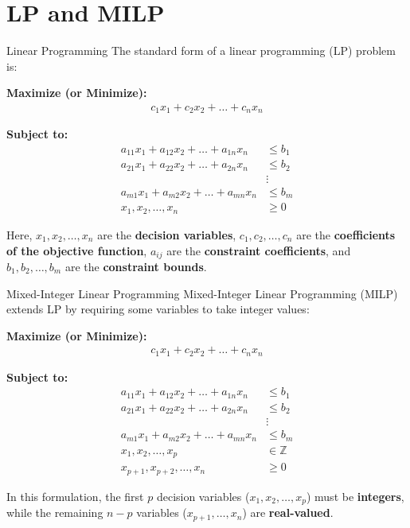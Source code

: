 \documentclass{beamer}
\begin{document}
\section{LP and MILP}
\begin{frame}{Linear Programming}
The standard form of a linear programming (LP) problem is:

\vspace{0.5em}
\textbf{Maximize (or Minimize):}
\begin{align*}
    c_1x_1 + c_2x_2 + \dots + c_nx_n
\end{align*}

\vspace{0.5em}
\textbf{Subject to:}
\begin{align*}
    a_{11}x_1 + a_{12}x_2 + \dots + a_{1n}x_n &\leq b_1 \\
    a_{21}x_1 + a_{22}x_2 + \dots + a_{2n}x_n &\leq b_2 \\
    &\vdots \\
    a_{m1}x_1 + a_{m2}x_2 + \dots + a_{mn}x_n &\leq b_m \\
    x_1, x_2, \dots, x_n &\geq 0
\end{align*}

\vspace{0.5em}
\small
Here, $x_1, x_2, \dots, x_n$ are the \textbf{decision variables}, $c_1, c_2, \dots, c_n$ are the \textbf{coefficients of the objective function}, $a_{ij}$ are the \textbf{constraint coefficients}, and $b_1, b_2, \dots, b_m$ are the \textbf{constraint bounds}.
\end{frame}
\begin{frame}{Mixed-Integer Linear Programming}
Mixed-Integer Linear Programming (MILP) extends LP by requiring some variables to take integer values:

\vspace{0.5em}
\textbf{Maximize (or Minimize):}
\begin{align*}
    c_1x_1 + c_2x_2 + \dots + c_nx_n
\end{align*}

\vspace{0.5em}
\textbf{Subject to:}
\begin{align*}
    a_{11}x_1 + a_{12}x_2 + \dots + a_{1n}x_n &\leq b_1 \\
    a_{21}x_1 + a_{22}x_2 + \dots + a_{2n}x_n &\leq b_2 \\
    &\vdots \\
    a_{m1}x_1 + a_{m2}x_2 + \dots + a_{mn}x_n &\leq b_m \\
    x_1, x_2, \dots, x_p &\in \mathbb{Z} \\
    x_{p+1}, x_{p+2}, \dots, x_n &\geq 0
\end{align*}

\vspace{0.5em}
\small
In this formulation, the first $p$ decision variables ($x_1, x_2, \dots, x_p$) must be \textbf{integers}, while the remaining $n-p$ variables ($x_{p+1}, \dots, x_n$) are \textbf{real-valued}.
\end{frame}
\end{document}
